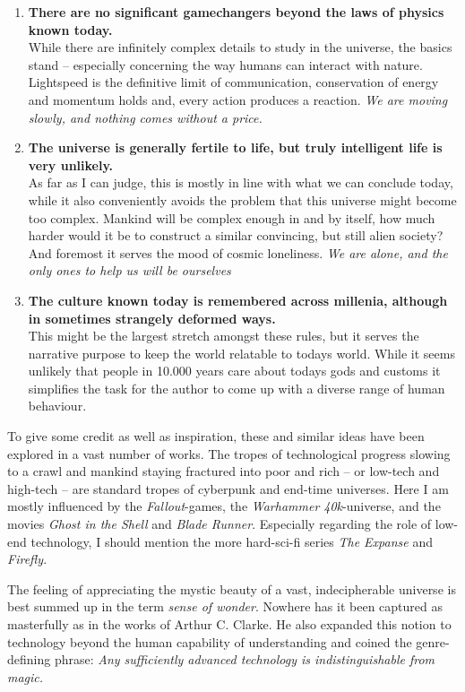 \begin{enumerate}
\item \textbf{There are no significant gamechangers beyond the laws of physics known
today.}\\
While there are infinitely complex details to study in the universe, the basics
stand -- especially concerning the way humans can interact with nature.
Lightspeed is the definitive limit of communication, conservation of energy
and momentum holds and, every action produces a reaction.
\emph{We are moving slowly, and nothing comes without a price.}
\item \textbf{The universe is generally fertile to life, but truly intelligent life
is very unlikely.}\\
As far as I can judge, this is mostly in line with what we can conclude today,
while it also conveniently avoids the problem that this universe might become
too complex. Mankind will be complex enough in and by itself, how much harder
would it be to construct a similar convincing, but still alien society?
And foremost it serves the mood of cosmic loneliness. \emph{We are alone, and
the only ones to help us will be ourselves}
\item \textbf{The culture known today is remembered across millenia, although in
sometimes strangely deformed ways.}\\
This might be the largest stretch amongst these rules, but it serves the
narrative purpose to keep the world relatable to todays world.
While it seems unlikely that people in 10.000 years care about todays gods and
customs it simplifies the task for the author to come up with a diverse range
of human behaviour.
\end{enumerate}

To give some credit as well as inspiration, these and similar ideas have been
explored in a vast number of works. The tropes of technological progress
slowing to a crawl and mankind staying fractured into poor and rich -- or low-tech
and high-tech -- are standard tropes of cyberpunk and end-time universes. Here
I am mostly influenced by the \textit{Fallout}-games, the
\textit{Warhammer 40k}-universe, and the movies \textit{Ghost in the Shell} and
\textit{Blade Runner}. Especially regarding the role of low-end technology, I
should mention the more hard-sci-fi series \textit{The Expanse} and
\textit{Firefly}.

The feeling of appreciating the mystic beauty of a vast, indecipherable universe
is best summed up in the term \emph{sense of wonder}. Nowhere has it been
captured as masterfully as in the works of Arthur C. Clarke. He also expanded
this notion to technology beyond the human capability of understanding and
coined the genre-defining phrase: \emph{Any sufficiently advanced technology is
indistinguishable from magic.}

